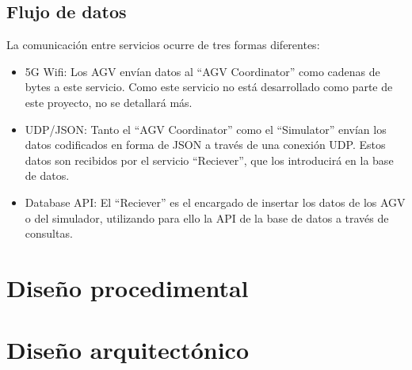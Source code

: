 
\subsection*{Flujo de datos}

La comunicación entre servicios ocurre de tres formas diferentes:
\begin{itemize}
    \item 5G Wifi: Los AGV envían datos al ``AGV Coordinator'' como cadenas de bytes a este servicio.
        Como este servicio no está desarrollado como parte de este proyecto, no se detallará más.
    \item UDP/JSON: Tanto el ``AGV Coordinator'' como el ``Simulator'' envían los datos codificados en 
        forma de JSON a través de una conexión UDP. Estos datos son recibidos por el servicio ``Reciever'',
        que los introducirá en la base de datos.
    \item Database API: El ``Reciever'' es el encargado de insertar los datos de los AGV o del simulador, 
        utilizando para ello la API de la base de datos a través de consultas.
\end{itemize}

\section{Diseño procedimental}


\section{Diseño arquitectónico}

